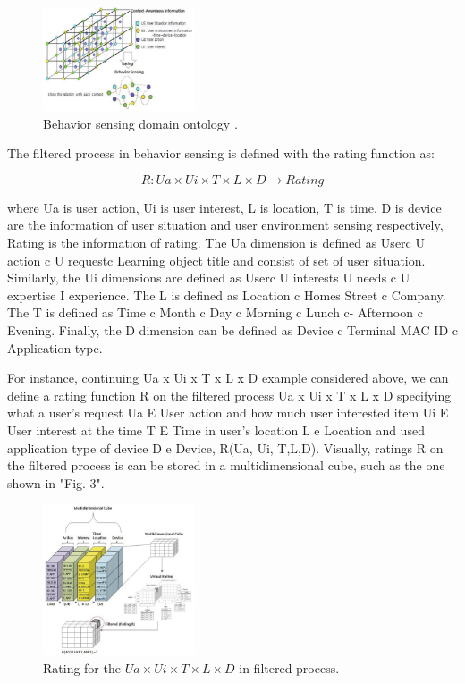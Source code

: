 \documentclass[journal]{vgtc}                %
\begin{document}
  \begin{figure}[htb]
    \centering
    \includegraphics[width=0.4\textwidth]{behaviour-sensing}
    \caption{Behavior sensing domain ontology \cite{Kim2013}.}
    \label{behaviour-sensing}
  \end{figure}

  The filtered process in behavior sensing is defined with the rating function as:

  \begin{equation}
    R: Ua \times Ui \times T \times L \times D \rightarrow Rating
  \end{equation}

  where Ua is user action, Ui is user interest, L is location, T is time, D is device are the information of user situation  and user environment sensing respectively, Rating is the  information of rating. The Ua dimension is defined as Userc U action c U requestc Learning object title and consist of set of user situation. Similarly, the Ui dimensions are defined as Userc U interests U needs c U expertise I experience. The L is defined as Location c Homes Street c Company. The T is defined as Time c Month c Day c Morning c Lunch c- Afternoon c Evening. Finally, the D dimension can be defined as Device c Terminal MAC ID c Application type.

  For instance, continuing Ua x Ui x T x L x D example considered above, we can define a rating function R on the filtered process Ua x Ui x T x L x D specifying what a user's request Ua E User action and how much user interested item Ui E User interest at the time T E Time in user's location L e Location and used application type of device D e Device, R(Ua, Ui, T,L,D). Visually, ratings R on the filtered process is can be stored in a multidimensional cube, such as the one shown in "Fig. 3".

  \begin{figure}[htb]
    \centering
    \includegraphics[width=0.4\textwidth]{rating}
    \caption{Rating for the $Ua \times Ui \times T \times L \times D$ in filtered process\cite{Kim2013}.}
    \label{rating}
  \end{figure}
\end{document}
